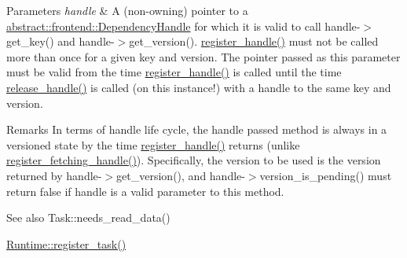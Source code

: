 \begin{DoxyParams}{Parameters}
{\em handle} & A (non-\/owning) pointer to a \hyperlink{classdarma__runtime_1_1abstract_1_1frontend_1_1_dependency_handle}{abstract\+::frontend\+::\+Dependency\+Handle} for which it is valid to call handle-\/$>$get\+\_\+key() and handle-\/$>$get\+\_\+version(). \hyperlink{classdarma__runtime_1_1abstract_1_1backend_1_1_runtime_a8c70dc2b90fedd7ae6f090a19b3f694f}{register\+\_\+handle()} must not be called more than once for a given key and version. The pointer passed as this parameter must be valid from the time \hyperlink{classdarma__runtime_1_1abstract_1_1backend_1_1_runtime_a8c70dc2b90fedd7ae6f090a19b3f694f}{register\+\_\+handle()} is called until the time \hyperlink{classdarma__runtime_1_1abstract_1_1backend_1_1_runtime_a54ba21615ed22638ea23a2a1f03fea02}{release\+\_\+handle()} is called (on this instance!) with a handle to the same key and version.\\
\hline
\end{DoxyParams}
\begin{DoxyRemark}{Remarks}
In terms of handle life cycle, the handle passed method is always in a versioned state by the time \hyperlink{classdarma__runtime_1_1abstract_1_1backend_1_1_runtime_a8c70dc2b90fedd7ae6f090a19b3f694f}{register\+\_\+handle()} returns (unlike \hyperlink{classdarma__runtime_1_1abstract_1_1backend_1_1_runtime_acdb81206fe8a663754cf68f44731b35e}{register\+\_\+fetching\+\_\+handle()}). Specifically, the version to be used is the version returned by handle-\/$>$get\+\_\+version(), and handle-\/$>$version\+\_\+is\+\_\+pending() must return false if handle is a valid parameter to this method.
\end{DoxyRemark}
\begin{DoxySeeAlso}{See also}
Task\+::needs\+\_\+read\+\_\+data() 

\hyperlink{classdarma__runtime_1_1abstract_1_1backend_1_1_runtime_aec2382c6822c63ed76f69af1e1f8470b}{Runtime\+::register\+\_\+task()} 
\end{DoxySeeAlso}
